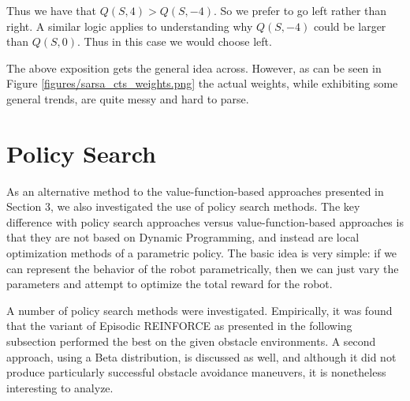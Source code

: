 \documentclass{article}
\begin{document}
Thus we have that $Q(S,4) > Q(S, -4)$. So we prefer to go left rather than right. A similar logic applies to understanding why $Q(S,-4)$ could be larger than $Q(S,0)$. Thus in this case we would choose left. 

The above exposition gets the general idea across. However, as can be seen in Figure \ref{figures/sarsa_cts_weights.png} the actual weights, while exhibiting some general trends, are quite messy and hard to parse.

%
%







\section{Policy Search}

As an alternative method to the value-function-based approaches presented in Section 3, we also investigated the use of policy search methods.  The key difference with policy search approaches versus value-function-based approaches is that they are not based on Dynamic Programming, and instead are local optimization methods of a parametric policy.  The basic idea is very simple: if we can represent the behavior of the robot parametrically, then we can just vary the parameters and attempt to optimize the total reward for the robot.

A number of policy search methods were investigated.  Empirically, it was found that the variant of Episodic REINFORCE as presented in the following subsection performed the best on the given obstacle environments.  A second approach, using a Beta distribution, is discussed as well, and although it did not produce particularly successful obstacle avoidance maneuvers, it is nonetheless interesting to analyze.
\end{document}
